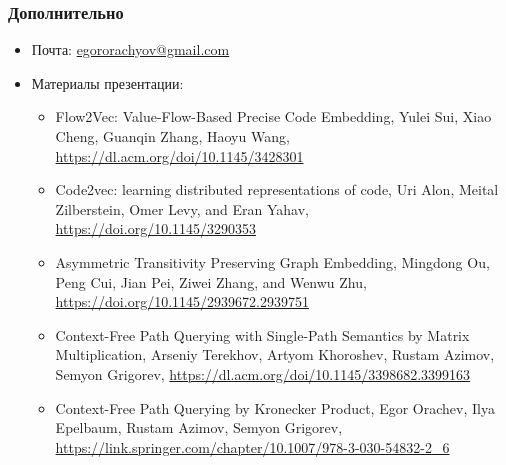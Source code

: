\documentclass[xcolor=table,english]{beamer}
\begin{document}
\begin{frame} \frametitle{Дополнительно}
    \begin{itemize}
        \item Почта: \href{mailto:egororachyov@gmail.com}{egororachyov@gmail.com}
        \item Материалы презентации:
        {
            \begin{itemize}
                \item Flow2Vec: Value-Flow-Based Precise Code Embedding, Yulei Sui, Xiao Cheng, Guanqin Zhang, Haoyu Wang, \href{https://dl.acm.org/doi/10.1145/3428301}{https://dl.acm.org/doi/10.1145/3428301}
                \item Code2vec: learning distributed representations of code, Uri Alon, Meital Zilberstein, Omer Levy, and Eran Yahav, \href{https://doi.org/10.1145/3290353}{https://doi.org/10.1145/3290353}
                \item Asymmetric Transitivity Preserving Graph Embedding, Mingdong Ou, Peng Cui, Jian Pei, Ziwei Zhang, and Wenwu Zhu, \href{https://doi.org/10.1145/2939672.2939751}{https://doi.org/10.1145/2939672.2939751}
                \item Context-Free Path Querying with Single-Path Semantics by Matrix Multiplication, Arseniy Terekhov, Artyom  Khoroshev, Rustam  Azimov, Semyon Grigorev, \href{https://dl.acm.org/doi/10.1145/3398682.3399163}{https://dl.acm.org/doi/10.1145/3398682.3399163}
                \item Context-Free Path Querying by Kronecker Product, Egor Orachev, Ilya Epelbaum, Rustam  Azimov, Semyon Grigorev, \href{https://link.springer.com/chapter/10.1007/978-3-030-54832-2\_6}{https://link.springer.com/chapter/10.1007/978-3-030-54832-2\_6}
            \end{itemize}
        }
    \end{itemize}
\end{frame}
\end{document}
